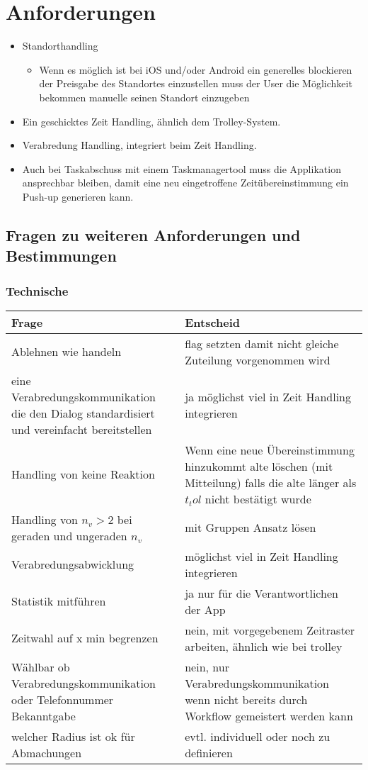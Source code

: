 
\section{Anforderungen}

\begin{itemize}
\item Standorthandling
\begin{itemize}
\item Wenn es möglich ist bei iOS und/oder Android ein generelles blockieren der Preisgabe des Standortes einzustellen muss der User die Möglichkeit bekommen manuelle seinen Standort einzugeben
\end{itemize}
\item Ein geschicktes Zeit Handling, ähnlich dem Trolley-System.
\item Verabredung Handling, integriert beim Zeit Handling.
\item Auch bei Taskabschuss mit einem Taskmanagertool muss die Applikation ansprechbar bleiben, damit eine neu eingetroffene Zeitübereinstimmung ein Push-up generieren kann.
\end{itemize}




\subsection{Fragen zu weiteren Anforderungen und Bestimmungen}

\subsubsection{Technische}

\begin{tabularx}{\textwidth}{X|X}
Frage & Entscheid \\\hline
Ablehnen wie handeln & flag setzten damit nicht gleiche Zuteilung vorgenommen wird\\\hline
eine Verabredungskommunikation die den Dialog standardisiert und vereinfacht bereitstellen & ja möglichst viel in Zeit Handling integrieren\\\hline
Handling von keine Reaktion & Wenn eine neue Übereinstimmung hinzukommt alte löschen (mit Mitteilung) falls die alte länger als $t_tol$ nicht bestätigt wurde\\\hline
Handling von $n_v>2$ bei geraden und ungeraden $n_v$ & mit Gruppen Ansatz lösen \\\hline
Verabredungsabwicklung & möglichst viel in Zeit Handling integrieren\\\hline
Statistik mitführen & ja nur für die Verantwortlichen der App\\\hline
Zeitwahl auf x min begrenzen & nein, mit vorgegebenem Zeitraster arbeiten, ähnlich wie bei trolley\\\hline
Wählbar ob Verabredungskommunikation oder Telefonnummer Bekanntgabe & nein, nur Verabredungskommunikation wenn nicht bereits durch Workflow gemeistert werden kann\\\hline
welcher Radius ist ok für Abmachungen& evtl. individuell oder noch zu definieren
\end{tabularx}


